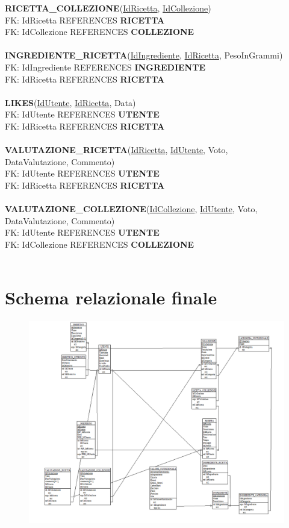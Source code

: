 ﻿\documentclass[a4paper,12pt]{report}
\begin{document}
\textbf{RICETTA\_COLLEZIONE}(\underline{IdRicetta}, \underline{IdCollezione})\\
FK: IdRicetta REFERENCES \textbf{RICETTA}\\
FK: IdCollezione REFERENCES \textbf{COLLEZIONE}\\\\
\textbf{INGREDIENTE\_RICETTA}(\underline{IdIngrediente}, \underline{IdRicetta}, PesoInGrammi)\\
FK: IdIngrediente REFERENCES \textbf{INGREDIENTE}\\
FK: IdRicetta REFERENCES \textbf{RICETTA}\\\\
\textbf{LIKES}(\underline{IdUtente}, \underline{IdRicetta}, Data)\\
FK: IdUtente REFERENCES \textbf{UTENTE}\\
FK: IdRicetta REFERENCES \textbf{RICETTA}\\\\
\textbf{VALUTAZIONE\_RICETTA}(\underline{IdRicetta}, \underline{IdUtente}, Voto,\\ DataValutazione, Commento)\\
FK: IdUtente REFERENCES \textbf{UTENTE}\\
FK: IdRicetta REFERENCES \textbf{RICETTA}\\\\
\textbf{VALUTAZIONE\_COLLEZIONE}(\underline{IdCollezione}, \underline{IdUtente}, Voto,\\ DataValutazione, Commento)\\
FK: IdUtente REFERENCES \textbf{UTENTE}\\
FK: IdCollezione REFERENCES \textbf{COLLEZIONE}\\\\
\section{Schema relazionale finale}
\begin{figure}
    \centering
    \includegraphics[width=1\linewidth]{app_images/schema_relazionale.png}
\end{figure}
\end{document}
